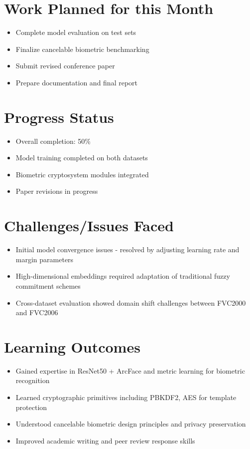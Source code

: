 \documentclass[12pt,a4paper]{article}
\begin{document}
\section{Work Planned for this Month}
\begin{itemize}[leftmargin=*]
    \item Complete model evaluation on test sets
    \item Finalize cancelable biometric benchmarking
    \item Submit revised conference paper
    \item Prepare documentation and final report
\end{itemize}


\section{Progress Status}
\begin{itemize}[leftmargin=*]
    \item Overall completion: 50\%
    \item Model training completed on both datasets
    \item Biometric cryptosystem modules integrated
    \item Paper revisions in progress
\end{itemize}

\section{Challenges/Issues Faced}
\begin{itemize}[leftmargin=*]
    \item Initial model convergence issues - resolved by adjusting learning rate and margin parameters
    \item High-dimensional embeddings required adaptation of traditional fuzzy commitment schemes
    \item Cross-dataset evaluation showed domain shift challenges between FVC2000 and FVC2006
\end{itemize}

\section{Learning Outcomes}
\begin{itemize}[leftmargin=*]
    \item Gained expertise in ResNet50 + ArcFace and metric learning for biometric recognition
    \item Learned cryptographic primitives including PBKDF2, AES for template protection
    \item Understood cancelable biometric design principles and privacy preservation
    \item Improved academic writing and peer review response skills
\end{itemize}
\end{document}
